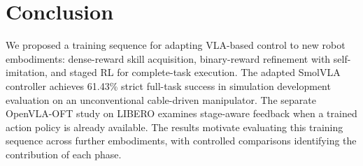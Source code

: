 \section{Conclusion}\label{sec:conclusion}
We proposed a training sequence for adapting VLA-based control to new robot embodiments: dense-reward skill acquisition, binary-reward refinement with self-imitation, and staged RL for complete-task execution. The adapted SmolVLA controller achieves 61.43\% strict full-task success in simulation development evaluation on an unconventional cable-driven manipulator. The separate OpenVLA-OFT study on LIBERO examines stage-aware feedback when a trained action policy is already available.  The results motivate evaluating this training sequence across further embodiments, with controlled comparisons identifying the contribution of each phase.
